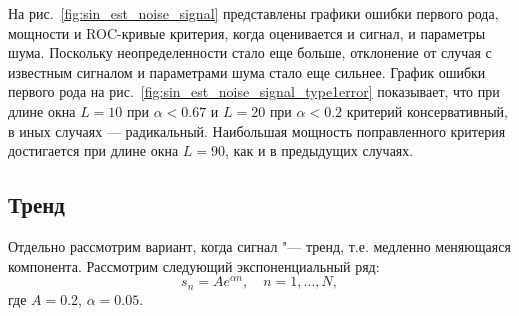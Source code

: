 \documentclass[specialist,
substylefile = spbu_report.rtx,
subf,href,colorlinks=true, 12pt]{disser}
\theoremstyle{definition}
\begin{document}
На рис.~\ref{fig:sin_est_noise_signal} представлены графики ошибки первого рода, мощности и ROC-кривые критерия, когда оценивается и сигнал, и параметры шума. Поскольку неопределенности стало еще больше, отклонение от случая с известным сигналом и параметрами шума стало еще сильнее. График ошибки первого рода на рис.~\ref{fig:sin_est_noise_signal_type1error} показывает, что при длине окна $L=10$ при $\alpha<0.67$ и $L=20$ при $\alpha<0.2$ критерий консервативный, в иных случаях --- радикальный. Наибольшая мощность поправленного критерия достигается при длине окна $L=90$, как и в предыдущих случаях.

\subsection{Тренд}
Отдельно рассмотрим вариант, когда сигнал "--- тренд, т.е. медленно меняющаяся компонента. Рассмотрим следующий экспоненциальный ряд:
\[
s_n=A e^{\alpha n},\quad n=1,\ldots,N,
\] 
где $A=0.2$, $\alpha=0.05$.
\end{document}
